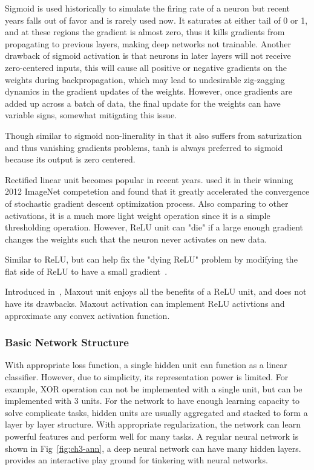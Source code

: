\begin{description}[labelindent=1cm]
  \item[Sigmoid] Sigmoid is used historically to simulate the firing rate of a neuron but recent years falls out of favor and is rarely used now. It saturates at either tail of 0 or 1, and at these regions the gradient is almost zero, thus it kills gradients from propagating to previous layers, making deep networks not trainable. Another drawback of sigmoid activation is that neurons in later layers will not receive zero-centered inputs, this will cause all positive or negative gradients on the weights during backpropagation, which may lead to undesirable zig-zagging dynamics in the gradient updates of the weights. However, once gradients are added up across a batch of data, the final update for the weights can have variable signs, somewhat mitigating this issue.
  \item[Tanh] Though similar to sigmoid non-linerality in that it also suffers from saturization and thus vanishing gradients problems, tanh is always preferred to sigmoid because its output is zero centered.
  \item[ReLU] Rectified linear unit becomes popular in recent years. \cite{krizhevsky2012imagenet} used it in their winning 2012 ImageNet competetion and found that it greatly accelerated the convergence of stochastic gradient descent optimization process. Also comparing to other activations, it is a much more light weight operation since it is a simple thresholding operation. However, ReLU unit can "die" if a large enough gradient changes the weights such that the neuron never activates on new data.
  \item[Leaky ReLU] Similar to ReLU, but can help fix the "dying ReLU" problem by modifying the flat side of ReLU to have a small gradient~\cite{he2015delving}.
  \item[Maxout] Introduced in~\cite{goodfellow2013maxout}, Maxout unit enjoys all the benefits of a ReLU unit, and does not have its drawbacks. Maxout activation can implement ReLU activtions and approximate any convex activation function.
\end{description}


\subsubsection{Basic Network Structure}
With appropriate loss function, a single hidden unit can function as a linear classifier. However, due to simplicity, its representation power is limited. For example, XOR operation can not be implemented with a single unit, but can be implemented with 3 units. For the network to have enough learning capacity to solve complicate tasks, hidden units are usually aggregated and stacked to form a layer by layer structure. With appropriate regularization, the network can learn powerful features and perform well for many tasks. A regular neural network is shown in Fig~\ref{fig:ch3-ann}, a deep neural network can have many hidden layers. \cite{links:nnplayground} provides an interactive play ground for tinkering with neural networks.


